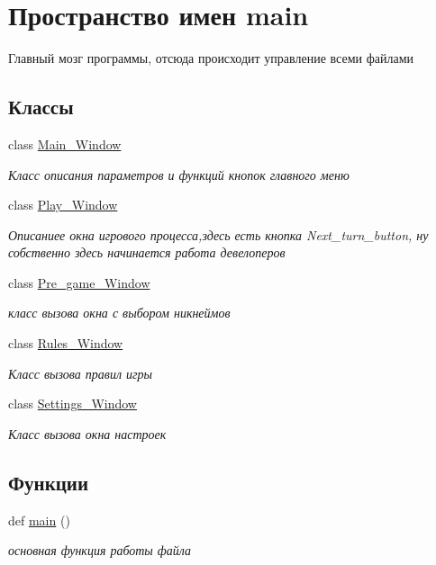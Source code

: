 \hypertarget{namespacemain}{}\section{Пространство имен main}
\label{namespacemain}


Главный мозг программы, отсюда происходит управление всеми файлами  


\subsection*{Классы}
\begin{DoxyCompactItemize}
\item 
class \mbox{\hyperlink{classmain_1_1_main___window}{Main\+\_\+\+Window}}
\begin{DoxyCompactList}\small\item\em Класс описания параметров и функций кнопок главного меню \end{DoxyCompactList}\item 
class \mbox{\hyperlink{classmain_1_1_play___window}{Play\+\_\+\+Window}}
\begin{DoxyCompactList}\small\item\em Описаниее окна игрового процесса,здесь есть кнопка Next\+\_\+turn\+\_\+button, ну собственно здесь начинается работа девелоперов \end{DoxyCompactList}\item 
class \mbox{\hyperlink{classmain_1_1_pre__game___window}{Pre\+\_\+game\+\_\+\+Window}}
\begin{DoxyCompactList}\small\item\em класс вызова окна с выбором никнеймов \end{DoxyCompactList}\item 
class \mbox{\hyperlink{classmain_1_1_rules___window}{Rules\+\_\+\+Window}}
\begin{DoxyCompactList}\small\item\em Класс вызова правил игры \end{DoxyCompactList}\item 
class \mbox{\hyperlink{classmain_1_1_settings___window}{Settings\+\_\+\+Window}}
\begin{DoxyCompactList}\small\item\em Класс вызова окна настроек \end{DoxyCompactList}\end{DoxyCompactItemize}
\subsection*{Функции}
\begin{DoxyCompactItemize}
\item 
\mbox{\label{namespacemain_af613cea4cba4fb7de8e40896b3368945}} 
def \mbox{\hyperlink{namespacemain_af613cea4cba4fb7de8e40896b3368945}{main}} ()
\begin{DoxyCompactList}\small\item\em основная функция работы файла \end{DoxyCompactList}\end{DoxyCompactItemize}
